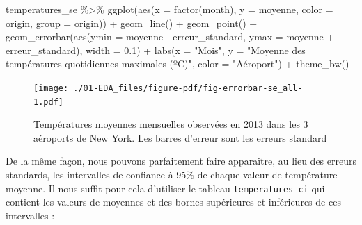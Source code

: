\documentclass[
  a4paper,
  DIV=11,
  numbers=noendperiod,
  oneside]{scrreprt}
\newenvironment{Shaded}{}{}
\newcommand{\AttributeTok}[1]{\textcolor[rgb]{0.84,0.23,0.29}{#1}}
\newcommand{\FloatTok}[1]{\textcolor[rgb]{0.00,0.36,0.77}{#1}}
\newcommand{\FunctionTok}[1]{\textcolor[rgb]{0.44,0.26,0.76}{#1}}
\newcommand{\NormalTok}[1]{\textcolor[rgb]{0.14,0.16,0.18}{#1}}
\newcommand{\SpecialCharTok}[1]{\textcolor[rgb]{0.00,0.36,0.77}{#1}}
\newcommand{\StringTok}[1]{\textcolor[rgb]{0.01,0.18,0.38}{#1}}
\begin{document}
\begin{Shaded}
\begin{Highlighting}[]
\NormalTok{temperatures\_se }\SpecialCharTok{\%\textgreater{}\%} 
  \FunctionTok{ggplot}\NormalTok{(}\FunctionTok{aes}\NormalTok{(}\AttributeTok{x =} \FunctionTok{factor}\NormalTok{(month), }\AttributeTok{y =}\NormalTok{ moyenne, }\AttributeTok{color =}\NormalTok{ origin, }\AttributeTok{group =}\NormalTok{ origin)) }\SpecialCharTok{+}
  \FunctionTok{geom\_line}\NormalTok{() }\SpecialCharTok{+}
  \FunctionTok{geom\_point}\NormalTok{() }\SpecialCharTok{+}
  \FunctionTok{geom\_errorbar}\NormalTok{(}\FunctionTok{aes}\NormalTok{(}\AttributeTok{ymin =}\NormalTok{ moyenne }\SpecialCharTok{{-}}\NormalTok{ erreur\_standard,}
                    \AttributeTok{ymax =}\NormalTok{ moyenne }\SpecialCharTok{+}\NormalTok{ erreur\_standard),}
                \AttributeTok{width =} \FloatTok{0.1}\NormalTok{) }\SpecialCharTok{+}
  \FunctionTok{labs}\NormalTok{(}\AttributeTok{x =} \StringTok{"Mois"}\NormalTok{, }
       \AttributeTok{y =} \StringTok{"Moyenne des températures quotidiennes maximales (ºC)"}\NormalTok{,}
       \AttributeTok{color =} \StringTok{"Aéroport"}\NormalTok{) }\SpecialCharTok{+}
  \FunctionTok{theme\_bw}\NormalTok{()}
\end{Highlighting}
\end{Shaded}

\begin{figure}[H]

{\centering \texttt{[image: ./01-EDA\_files/figure-pdf/fig-errorbar-se\_all-1.pdf]}

}

\caption{\label{fig-errorbar-se_all}Températures moyennes mensuelles
observées en 2013 dans les 3 aéroports de New York. Les barres d'erreur
sont les erreurs standard}

\end{figure}

De la même façon, nous pouvons parfaitement faire apparaître, au lieu
des erreurs standards, les intervalles de confiance à 95\% de chaque
valeur de température moyenne. Il nous suffit pour cela d'utiliser le
tableau \texttt{temperatures\_ci} qui contient les valeurs de moyennes
et des bornes supérieures et inférieures de ces intervalles :
\end{document}

